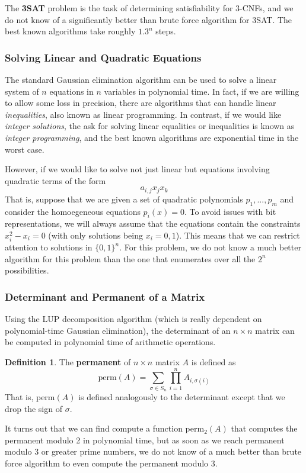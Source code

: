 \documentclass[a4paper, 12pt]{report}
\theoremstyle{remark}
\theoremstyle{definition}
\newtheorem{definition}{Definition}[section]
\begin{document}
The \textbf{3SAT} problem is the task of determining satisfiability for $3$-CNFs, and we do not know of a significantly better than brute force algorithm for 3SAT. The best known algorithms take roughly $1.3^n$ steps. 

\subsubsection{Solving Linear and Quadratic Equations}
The standard Gaussian elimination algorithm can be used to solve a linear system of $n$ equations in $n$ variables in polynomial time. In fact, if we are willing to allow some loss in precision, there are algorithms that can handle linear \textit{inequalities}, also known as linear programming. In contrast, if we would like \textit{integer solutions}, the ask for solving linear equalities or inequalities is known as \textit{integer programming}, and the best known algorithms are exponential time in the worst case. 

However, if we would like to solve not just linear but equations involving quadratic terms of the form 
\[a_{i, j} x_j x_k\]
That is, suppose that we are given a set of quadratic polynomials $p_1, ..., p_m$ and consider the homoegeneous equations $p_i (x) = 0$. To avoid issues with bit representations, we will always assume that the equations contain the constraints $x_i^2 - x_i = 0$ (with only solutions being $x_i = 0, 1$). This means that we can restrict attention to solutions in $\{0,1\}^n$. For this problem, we do not know a much better algorithm for this problem than the one that enumerates over all the $2^n$ possibilities. 

\subsubsection{Determinant and Permanent of a Matrix}
Using the LUP decomposition algorithm (which is really dependent on polynomial-time Gaussian elimination), the determinant of an $n \times n$ matrix can be computed in polynomial time of arithmetic operations. 

\begin{definition}
The \textbf{permanent} of $n \times n$ matrix $A$ is defined as
\[\text{perm}(A)= \sum_{\sigma \in S_n} \prod_{i=1}^n A_{i, \sigma(i)}\]
That is, perm$(A)$ is defined analogously to the determinant except that we drop the sign of $\sigma$. 
\end{definition}

It turns out that we can find compute a function perm$_2 (A)$ that computes the permanent modulo 2 in polynomial time, but as soon as we reach permanent modulo 3 or greater prime numbers, we do not know of a much better than brute force algorithm to even compute the permanent modulo 3. 
\end{document}
